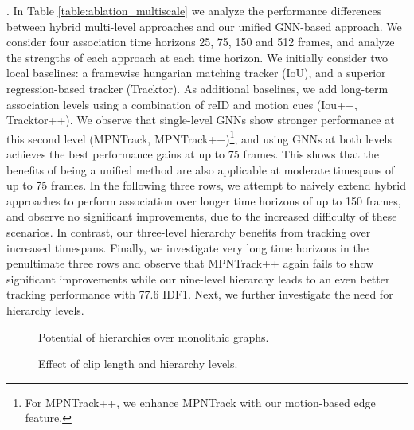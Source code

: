 \documentclass[10pt,twocolumn,letterpaper]{article}
\begin{document}
{{. In Table \ref{table:ablation_multiscale} we analyze the performance differences between hybrid multi-level approaches and our unified GNN-based approach. We consider four association time horizons 25, 75, 150 and 512 frames, and analyze the strengths of each approach at each time horizon. We initially consider two local baselines: a framewise hungarian matching tracker (IoU), and a superior regression-based tracker (Tracktor)\cite{tracktor}. 
As additional baselines, we add long-term association levels using a combination of reID and motion cues (Iou++, Tracktor++). We observe that single-level GNNs show stronger performance at this second level (MPNTrack, MPNTrack++)\footnote{For MPNTrack++, we enhance MPNTrack  with our motion-based edge  feature. }, and using GNNs at both levels achieves the best performance gains at up to 75 frames. 
This shows that the benefits of being a unified method are also applicable at moderate timespans of up to 75 frames. In the following three rows, we attempt to naively extend hybrid approaches to perform association over longer time horizons of up to 150 frames, and observe no significant improvements, due to the increased difficulty of these scenarios. In contrast, our three-level hierarchy benefits from tracking over increased timespans. 
Finally, we investigate very long time horizons in the penultimate three rows and observe that MPNTrack++ again fails to show significant improvements while our nine-level hierarchy leads to an even better tracking performance with 77.6 IDF1. 
Next, we further investigate the need for hierarchy levels.



\begin{figure*}
     \centering
     \begin{subfigure}[b]{0.33\textwidth}
         \centering
         \caption{Potential of hierarchies over monolithic graphs.}
         \label{fig:ablation_oracle}
     \end{subfigure}
     \hfill
     \begin{subfigure}[b]{0.36\textwidth}
         \centering
         
         \caption{Effect of clip length and hierarchy levels.}
         \label{fig:ablation_hierarchy}
     \end{subfigure}
     \hfill
     \begin{subfigure}[b]{0.30\textwidth}
         \centering
         

\end{subfigure}
\end{figure*}}}
\end{document}
